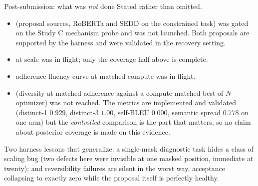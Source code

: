 \documentclass{beamer}
\begin{document}
\begin{frame}[noframenumbering]{Post-submission: what was \emph{not} done}
  \small
  Stated rather than omitted.
  \begin{itemize}\small
    \item {} (proposal sources, RoBERTa and SEDD on the constrained task) was
      gated on the Study C mechanism probe and was not launched. Both proposals are supported by
      the harness and were validated in the recovery setting.
    \item {} at scale was in flight; only the
      coverage half above is complete.
    \item {} adherence-fluency curve at matched compute was in flight.
    \item {} (diversity at matched adherence against a compute-matched
      best-of-$N$ optimizer) was not reached. The metrics are implemented and validated
      (distinct-1 $0.929$, distinct-3 $1.00$, self-BLEU $0.000$, semantic spread $0.778$ on one
      arm) but the \emph{controlled} comparison is the part that matters, so no claim about
      posterior coverage is made on this evidence.
  \end{itemize}
  \vspace{0.3em}
  {\footnotesize Two harness lessons that generalize: a single-mask diagnostic task hides a class
  of scaling bug (two defects here were invisible at one masked position, immediate at twenty);
  and reversibility failures are silent in the worst way, acceptance collapsing to exactly zero
  while the proposal itself is perfectly healthy.}
\end{frame}
\end{document}
